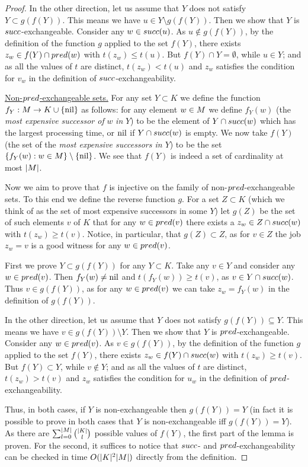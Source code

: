 \documentclass{article}
\theoremstyle{definition}
\begin{document}
\begin{proof}
In the other direction, let us assume that $Y$ does not satisfy $Y \subset g(f(Y))$.
This means we have $u \in Y \setminus g(f(Y))$.
Then we show that $Y$ is ${succ}$-exchangeable.
Consider any $w \in {\ensuremath{succ}}(u)$.
As $u \notin g(f(Y))$, by the definition of the function $g$ applied to the set $f(Y)$,
there exists $z_w \in f(Y) \cap {\ensuremath{pred}}(w)$ with
$t(z_w) \leq t(u)$. But $f(Y) \cap Y = \emptyset$, while $u \in Y$;
and as all the values of $t$ are distinct, $t(z_w) < t(u)$
and $z_w$ satisfies the condition for $v_w$ in the definition of
${succ}$-exchangeability.

{\underline{Non-${pred}$-exchangeable sets.}}
For any set $Y \subset K$ we define the function 
$f_Y : M \to K \cup \{\textrm{nil}\}$ as follows:
for any element $w \in M$ we define $f_Y(w)$ 
(the {\em most expensive successor of} $w$ {\em in} $Y$) to be the element of
$Y \cap {\ensuremath{succ}}(w)$ which has the largest processing time,
or $\textrm{nil}$ if $Y \cap {\ensuremath{succ}}(w)$ is empty.
We now take $f(Y)$ (the set of the {\em most expensive successors in $Y$})
to be the set $\{f_Y(w) : w \in M\} \setminus \{\textrm{nil}\}$.
We see that $f(Y)$ is indeed a set of cardinality at most $|M|$.

Now we aim to prove that $f$ is injective on the family of non-${pred}$-exchangeable sets.
To this end we define the reverse function $g$. For a set $Z \subset K$
(which we think of as the set of most expensive successors in some $Y$)
let $g(Z)$ be the set of such elements $v$ of $K$
that for any $w \in {\ensuremath{pred}}(v)$ there exists a $z_w \in Z \cap {\ensuremath{succ}}(w)$ with
$t(z_w) \geq t(v)$. 
Notice, in particular, that $g(Z) \subset Z$, as for $v \in Z$ the job $z_w = v$ is a good witness for any $w \in {\ensuremath{pred}}(v)$.

First we prove $Y \subset g(f(Y))$ for any $Y \subset K$.
Take any $v \in Y$ and consider any $w \in {\ensuremath{pred}}(v)$.
Then $f_Y(w) \neq \textrm{nil}$  and $t(f_Y(w)) \geq t(v)$,
as $v \in Y \cap {\ensuremath{succ}}(w)$.
Thus $v \in g(f(Y))$, as for any $w \in {\ensuremath{pred}}(v)$ we can take $z_w = f_Y(w)$
in the definition of $g(f(Y))$.

In the other direction, let us assume that $Y$ does not satisfy $g(f(Y)) \subseteq Y$.
This means we have $v \in g(f(Y)) \setminus Y$.
Then we show that $Y$ is ${pred}$-exchangeable.
Consider any $w \in {\ensuremath{pred}}(v)$.
As $v \in g(f(Y))$, by the definition of the function $g$ applied to the set $f(Y)$,
 there exists $z_w \in f(Y) \cap {\ensuremath{succ}}(w)$ with
$t(z_w) \geq t(v)$. But $f(Y) \subset Y$, while $v \not\in Y$;
and as all the values of $t$ are distinct, $t(z_w) > t(v)$
and $z_w$ satisfies the condition for $u_w$ in the definition of
${pred}$-exchangeability.

Thus, in both cases, if $Y$ is non-exchangeable then $g(f(Y)) = Y$ (in fact it is possible
to prove in both cases that $Y$ is non-exchangeable iff $g(f(Y))=Y$).
As there are $\sum_{l = 0}^{|M|} \binom{|K|}{l}$ possible values of $f(Y)$,
the first part of the lemma is proven.
For the second, it suffices to notice that ${succ}$- and ${pred}$-exchangeability can be checked
in time $O(|K|^2 |M|)$ directly from the definition. 
\end{proof}
\end{document}
